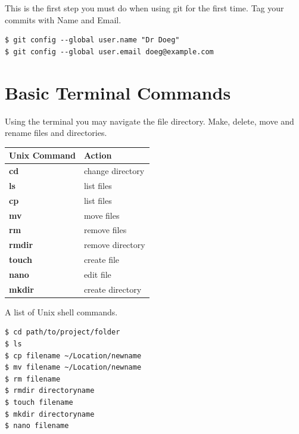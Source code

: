 \begin{marginfigure}[60pt]

This is the first step you must do when using git for the first time. Tag your commits with Name and Email.
\end{marginfigure}
\begin{shaded}
\begin{verbatim}
$ git config --global user.name "Dr Doeg"
$ git config --global user.email doeg@example.com
\end{verbatim}
\end{shaded}


\newpage

\section{Basic Terminal Commands }

Using the terminal you may navigate the file directory.  Make, delete, move and rename files and directories.

\begin{margintable}[50pt]
  \footnotesize%
  \begin{center}
    \begin{tabular}{ll}
      \toprule
     Unix Command & Action \\
      \midrule
     \bf{cd}  & change directory        \\
    \bf{ls}  & list files        \\
     \bf{cp}  & list files        \\
      \bf{mv}  & move files        \\
       \bf{rm}  & remove files        \\
        \bf{rmdir}  & remove directory        \\
         \bf{touch}  & create file        \\
          \bf{nano}  & edit file        \\
           \bf{mkdir}  & create directory        \\
      \bottomrule
    \end{tabular}
  \end{center}
  \caption{A list of Unix shell commands.}
  \label{tab:font-sizes}
\end{margintable}


\begin{shaded}
\begin{verbatim}
$ cd path/to/project/folder
$ ls
$ cp filename ~/Location/newname
$ mv filename ~/Location/newname
$ rm filename
$ rmdir directoryname
$ touch filename
$ mkdir directoryname
$ nano filename
\end{verbatim}
\end{shaded}

